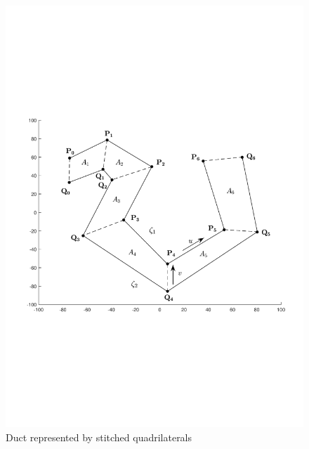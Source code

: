 \documentclass[12pt,a4]{article}
\begin{document}
\begin{figure}[h]
\centering
\includegraphics[scale=0.5]{figures/fig7.pdf}
\caption{Duct represented by stitched quadrilaterals\label{fig:stitchequads}}
\end{figure}
\end{document}
